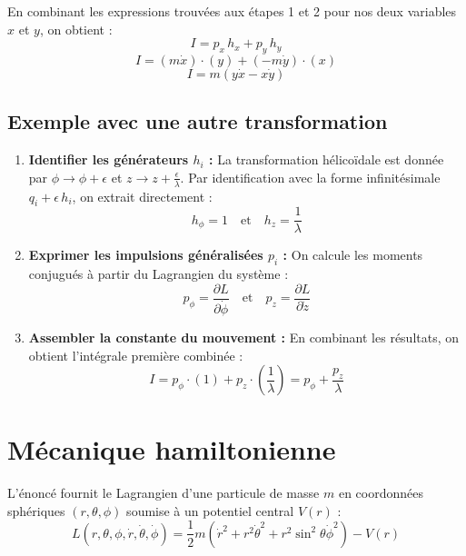 \documentclass[french]{yLectureNote}
\begin{document}
En combinant les expressions trouvées aux étapes 1 et 2 pour nos deux variables $x$ et $y$, on obtient :
$$ I = p_x \, h_x + p_y \, h_y $$
$$ I = (m\dot{x}) \cdot (y) + (-m\dot{y}) \cdot (x) $$
$$ I = m(y\dot{x} - x\dot{y}) $$


\subsection{Exemple avec une autre transformation}


\begin{enumerate}
    \item \textbf{Identifier les générateurs $h_i$ :} 
    La transformation hélicoïdale est donnée par $\phi \to \phi + \epsilon$ et $z \to z + \frac{\epsilon}{\lambda}$. Par identification avec la forme infinitésimale $q_i + \epsilon \, h_i$, on extrait directement :
    $$ h_\phi = 1 \quad \text{et} \quad h_z = \frac{1}{\lambda} $$

    \item \textbf{Exprimer les impulsions généralisées $p_i$ :}
    On calcule les moments conjugués à partir du Lagrangien du système :
    $$ p_\phi = \frac{\partial L}{\partial \dot{\phi}} \quad \text{et} \quad p_z = \frac{\partial L}{\partial \dot{z}} $$

    \item \textbf{Assembler la constante du mouvement :}
    En combinant les résultats, on obtient l'intégrale première combinée :
    $$ I = p_\phi \cdot (1) + p_z \cdot \left(\frac{1}{\lambda}\right) = p_\phi + \frac{p_z}{\lambda} $$
\end{enumerate}



\section{Mécanique hamiltonienne}

L'énoncé fournit le Lagrangien d'une particule de masse $m$ en coordonnées sphériques $(r, \theta, \phi)$ soumise à un potentiel central $V(r)$ :
$$ L(r, \theta, \phi, \dot{r}, \dot{\theta}, \dot{\phi}) = \frac{1}{2}m\left(\dot{r}^{2}+r^{2}\dot{\theta}^{2}+r^{2}\sin^{2}\theta\dot{\phi}^{2}\right)-V(r) $$

\end{document}
